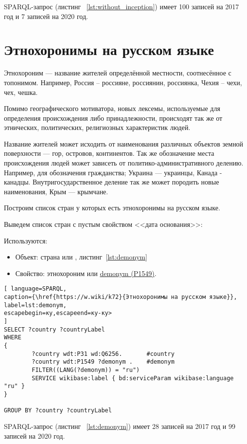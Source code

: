 SPARQL-запрос (листинг ~\ref{lst:without_inception}) имеет 100 записей на 2017 год и 7 записей на 2020 год.
\section{Этнохоронимы на русском языке}

Этнохороним — название жителей определённой местности, соотнесённое с топонимом. Например, Россия – россияне, россиянин, россиянка, Чехия – чехи, чех, чешка.

Помимо географического мотиватора, новых лексемы, используемые для определения происхождения либо принадлежности, происходят так же от этнических, политических, религиозных характеристик людей. 

Название жителей может исходить от наименования различных объектов земной поверхности — гор, островов, континентов. Так же обозначение места происхождения людей может зависеть от политико-административного делению. Например, для обозначения гражданства; Украина — украинцы, Канада - канадцы. Внутригосударственное деление так же может породить новые наименования, Крым — крымчане.

Построим список стран у которых есть этнохоронимы на русском языке.

Выведем список стран с пустым свойством <<дата основания>>:

Используются:

\begin{itemize}
	\item Объект: страна или , листинг~\ref{lst:demonym}
	\item Свойство: этнохороним или \href{https://www.wikidata.org/wiki/Property:P1549}{demonym (P1549)}.
\end{itemize}

\begin{lstlisting}[ language=SPARQL, 
caption={\href{https://w.wiki/k72}{Этнохоронимы на русском языке}},
label=lst:demonym, 
escapebegin=ку,escapeend=ку-ку>
]
SELECT ?country ?countryLabel 
WHERE
{
		?country wdt:P31 wd:Q6256.       #country
		?country wdt:P1549 ?demonym .    #demonym
		FILTER((LANG(?demonym)) = "ru")
		SERVICE wikibase:label { bd:serviceParam wikibase:language "ru" }
}

GROUP BY ?country ?countryLabel
\end{lstlisting}

SPARQL-запрос (листинг ~\ref{lst:demonym}) имеет 28 записей на 2017 год и 99 записей на 2020 год.

